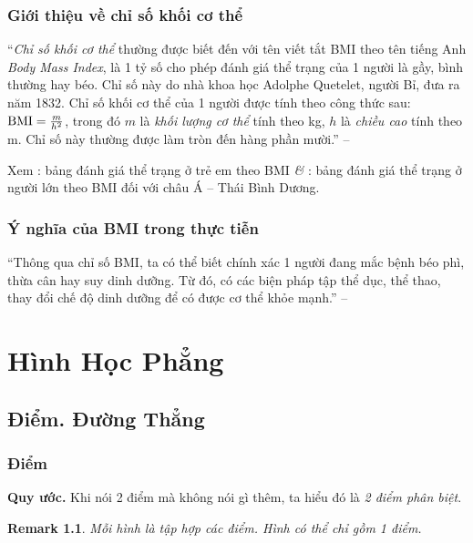 \documentclass[oneside]{book}
\numberwithin{equation}{section}
\newtheorem{remark}{Remark}[section]
\begin{document}
\subsection{Giới thiệu về chỉ số khối cơ thể}
``\textit{Chỉ số khối cơ thể} thường được biết đến với tên viết tắt BMI theo tên tiếng Anh \textit{Body Mass Index}, là 1 tỷ số cho phép đánh giá thể trạng của 1 người là gầy, bình thường hay béo. Chỉ số này do nhà khoa học Adolphe Quetelet, người Bỉ, đưa ra năm 1832. Chỉ số khối cơ thể của 1 người được tính theo công thức sau: ${\rm BMI} = \frac{m}{h^2}$, trong đó $m$ là \textit{khối lượng cơ thể} tính theo kg, $h$ là \textit{chiều cao} tính theo m. Chỉ số này thường được làm tròn đến hàng phần mười.'' -- \cite[p. 73]{Thai_Anh_Dat_Ha_Loan_Nam_Quang_Toan_6_tap_2}

Xem \cite[Hình 1, p. 73]{Thai_Anh_Dat_Ha_Loan_Nam_Quang_Toan_6_tap_2}: bảng đánh giá thể trạng ở trẻ em theo BMI \textit{\&} \cite[p. 74]{Thai_Anh_Dat_Ha_Loan_Nam_Quang_Toan_6_tap_2}: bảng đánh giá thể trạng ở người lớn theo BMI đối với châu Á -- Thái Bình Dương.

\subsection{Ý nghĩa của BMI trong thực tiễn}
``Thông qua chỉ số BMI, ta có thể biết chính xác 1 người đang mắc bệnh béo phì, thừa cân hay suy dinh dưỡng. Từ đó, có các biện pháp tập thể dục, thể thao, thay đổi chế độ dinh dưỡng để có được cơ thể khỏe mạnh.'' -- \cite[p. 74]{Thai_Anh_Dat_Ha_Loan_Nam_Quang_Toan_6_tap_2}


\chapter{Hình Học Phẳng}

\section{Điểm. Đường Thẳng}

\subsection{Điểm}
\textbf{Quy ước.} Khi nói 2 điểm mà không nói gì thêm, ta hiểu đó là \textit{2 điểm phân biệt}.

\begin{remark}
	Mỗi hình là tập hợp các điểm. Hình có thể chỉ gồm 1 điểm.
\end{remark}
\end{document}
